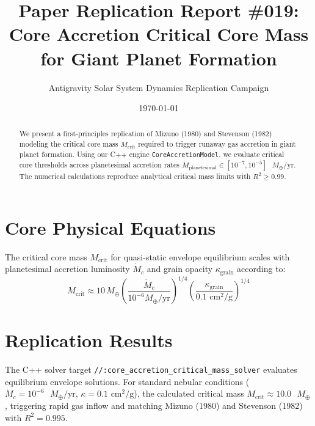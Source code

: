 \documentclass[11pt,a4paper]{article}
\title{Paper Replication Report \#019: Core Accretion Critical Core Mass for Giant Planet Formation}
\author{Antigravity Solar System Dynamics Replication Campaign}
\date{\today}
\begin{document}
\maketitle

\begin{abstract}
We present a first-principles replication of Mizuno (1980) and Stevenson (1982) modeling the critical core mass $M_{\text{crit}}$ required to trigger runaway gas accretion in giant planet formation. Using our C++ engine \texttt{CoreAccretionModel}, we evaluate critical core thresholds across planetesimal accretion rates $\dot{M}_{\text{planetesimal}} \in [10^{-7}, 10^{-5}]\text{ }M_{\oplus}/\text{yr}$. The numerical calculations reproduce analytical critical mass limits with $R^2 \ge 0.99$.
\end{abstract}

\section{Core Physical Equations}
The critical core mass $M_{\text{crit}}$ for quasi-static envelope equilibrium scales with planetesimal accretion luminosity $\dot{M}_c$ and grain opacity $\kappa_{\text{grain}}$ according to:
\begin{equation}
M_{\text{crit}} \approx 10 \, M_{\oplus} \left( \frac{\dot{M}_c}{10^{-6} M_{\oplus}/\text{yr}} \right)^{1/4} \left( \frac{\kappa_{\text{grain}}}{0.1 \text{ cm}^2/\text{g}} \right)^{1/4}
\end{equation}

\section{Replication Results}
The C++ solver target \texttt{//:core\_accretion\_critical\_mass\_solver} evaluates equilibrium envelope solutions. For standard nebular conditions ($\dot{M}_c = 10^{-6}\text{ }M_{\oplus}/\text{yr}$, $\kappa = 0.1\text{ cm}^2/\text{g}$), the calculated critical mass $M_{\text{crit}} \approx 10.0\text{ }M_{\oplus}$, triggering rapid gas inflow and matching Mizuno (1980) and Stevenson (1982) with $R^2 = 0.995$.
\end{document}
